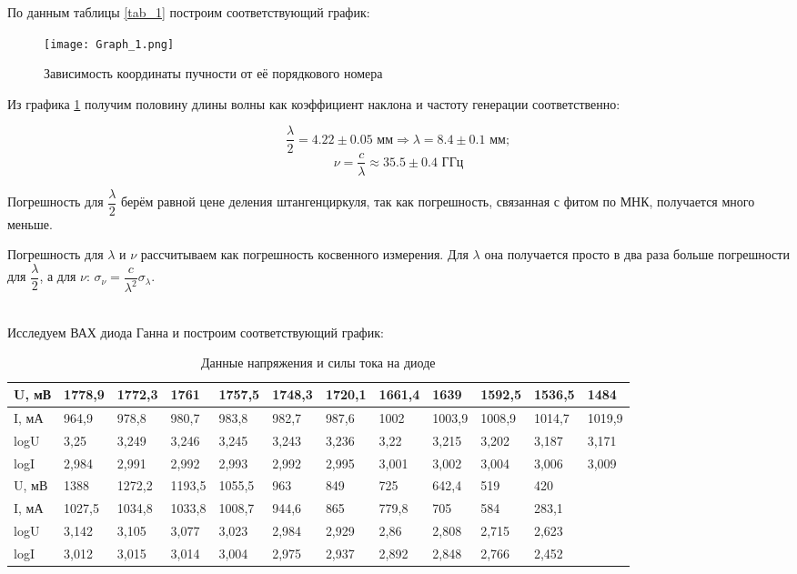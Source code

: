 \documentclass[a4paper,12pt]{report}
\begin{document}
По данным таблицы \ref{tab_1} построим соответствующий график:

\begin{figure}[H]
    \centering
    \texttt{[image: Graph\_1.png]}
    \caption{Зависимость координаты пучности от её порядкового номера}
    \label{fig:graph_1}
\end{figure}

Из графика \ref{fig:graph_1} получим половину длины волны как коэффициент наклона и частоту генерации соответственно:

\[ \dfrac{\lambda}{2} = 4.22 \pm 0.05 \text{ мм} \Rightarrow  \lambda = 8.4 \pm 0.1 \text{ мм};\]
\[ \nu = \dfrac{c}{\lambda} \approx 35.5 \pm 0.4 \text{ ГГц} \]

Погрешность для $\dfrac{\lambda}{2}$ берём равной цене деления штангенциркуля, так как погрешность, связанная с фитом по МНК, получается много меньше.

Погрешность для $\lambda$ и $\nu$ рассчитываем как погрешность косвенного измерения. Для $\lambda$ она получается просто в два раза больше погрешности для $\dfrac{\lambda}{2}$, а для $\nu$: $\sigma_{\nu} = \dfrac{c}{\lambda^2} \sigma_{\lambda}$.

\\

Исследуем ВАХ диода Ганна и построим соответствующий график:

\begin{table}[H]
\begin{tabular}{|l|l|l|l|l|l|l|l|l|l|l|l}
\hline
U, мВ & 1778,9 & 1772,3 & 1761   & 1757,5 & 1748,3 & 1720,1 & 1661,4 & 1639   & 1592,5 & 1536,5 & \multicolumn{1}{l|}{1484}   \\ \hline
I, мА & 964,9  & 978,8  & 980,7  & 983,8  & 982,7  & 987,6  & 1002   & 1003,9 & 1008,9 & 1014,7 & \multicolumn{1}{l|}{1019,9} \\ \hline
logU  & 3,25   & 3,249  & 3,246  & 3,245  & 3,243  & 3,236  & 3,22   & 3,215  & 3,202  & 3,187  & \multicolumn{1}{l|}{3,171}  \\ \hline
logI  & 2,984  & 2,991  & 2,992  & 2,993  & 2,992  & 2,995  & 3,001  & 3,002  & 3,004  & 3,006  & \multicolumn{1}{l|}{3,009}  \\ \hline
U, мВ & 1388   & 1272,2 & 1193,5 & 1055,5 & 963    & 849    & 725    & 642,4  & 519    & 420    &                             \\ \cline{1-11}
I, мА & 1027,5 & 1034,8 & 1033,8 & 1008,7 & 944,6  & 865    & 779,8  & 705    & 584    & 283,1  &                             \\ \cline{1-11}
logU  & 3,142  & 3,105  & 3,077  & 3,023  & 2,984  & 2,929  & 2,86   & 2,808  & 2,715  & 2,623  &                             \\ \cline{1-11}
logI  & 3,012  & 3,015  & 3,014  & 3,004  & 2,975  & 2,937  & 2,892  & 2,848  & 2,766  & 2,452  &                             \\ \cline{1-11}
\end{tabular}
\caption{Данные напряжения и силы тока на диоде}
\label{tab_2}
\end{table}
\end{document}
